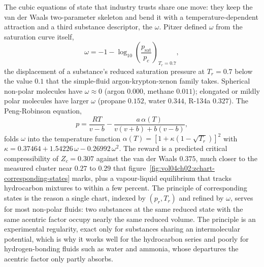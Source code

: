 

\begin{mastery}
The cubic equations of state that industry trusts share one move: they
keep the van der Waals two-parameter skeleton and bend it with a
temperature-dependent attraction and a third substance descriptor, the
 $\omega$. Pitzer defined $\omega$ from the
saturation curve itself,
\[
\omega = -1 - \log_{10}\!\left(\frac{p_{\text{sat}}}{p_c}\right)_{T_r =
0.7},
\]
the displacement of a substance's reduced saturation pressure at
$T_r = 0.7$ below the value $0.1$ that the simple-fluid argon-krypton-xenon
family takes. Spherical non-polar molecules have $\omega \approx 0$
(argon $0.000$, methane $0.011$); elongated or mildly polar molecules
have larger $\omega$ (propane $0.152$, water $0.344$, R-134a $0.327$).
The Peng-Robinson equation,
\[
p = \frac{RT}{v - b} - \frac{a\,\alpha(T)}{v(v + b) + b(v - b)},
\]
folds $\omega$ into the temperature function $\alpha(T) = [1 +
\kappa(1 - \sqrt{T_r})]^2$ with $\kappa = 0.37464 + 1.54226\,\omega -
0.26992\,\omega^2$. The reward is a predicted critical compressibility of
$Z_c = 0.307$ against the van der Waals $0.375$, much closer to the
measured cluster near $0.27$ to $0.29$ that
figure~\ref{fig:vol04ch02:zchart-corresponding-states} marks, plus a
vapour-liquid equilibrium that tracks hydrocarbon mixtures to within a
few percent. The principle of corresponding states is the reason a single
chart, indexed by $(p_r, T_r)$ and refined by $\omega$, serves for most
non-polar fluids: two substances at the same reduced state with the same
acentric factor occupy nearly the same reduced volume. The principle is
an experimental regularity, exact only for substances sharing an
intermolecular potential, which is why it works well for the hydrocarbon
series and poorly for hydrogen-bonding fluids such as water and ammonia,
whose departures the acentric factor only partly absorbs.
\end{mastery}

